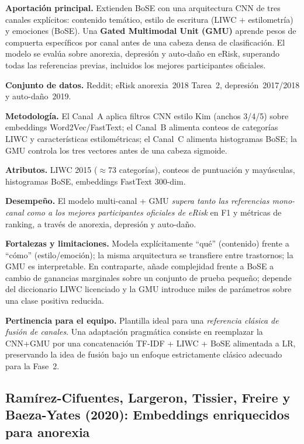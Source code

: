 \documentclass[journal]{IEEEtran}
\begin{document}
\textbf{Aportación principal.} Extienden BoSE con una arquitectura CNN de tres canales explícitos: contenido temático, estilo de escritura (LIWC + estilometría) y emociones (BoSE). Una \textbf{Gated Multimodal Unit (GMU)} aprende pesos de compuerta específicos por canal antes de una cabeza densa de clasificación. El modelo se evalúa sobre anorexia, depresión y auto-daño en eRisk, superando todas las referencias previas, incluidos los mejores participantes oficiales.

\textbf{Conjunto de datos.} Reddit; eRisk anorexia~2018 Tarea~2, depresión~2017/2018 y auto-daño~2019.

\textbf{Metodología.} El Canal~A aplica filtros CNN estilo Kim (anchos 3/4/5) sobre embeddings Word2Vec/FastText; el Canal~B alimenta conteos de categorías LIWC y características estilométricas; el Canal~C alimenta histogramas BoSE; la GMU controla los tres vectores antes de una cabeza sigmoide.

\textbf{Atributos.} LIWC 2015 ($\approx$73 categorías), conteos de puntuación y mayúsculas, histogramas BoSE, embeddings FastText 300-dim.

\textbf{Desempeño.} El modelo multi-canal + GMU \emph{supera tanto las referencias mono-canal como a los mejores participantes oficiales de eRisk} en F1 y métricas de ranking, a través de anorexia, depresión y auto-daño.

\textbf{Fortalezas y limitaciones.} Modela explícitamente ``qué'' (contenido) frente a ``cómo'' (estilo/emoción); la misma arquitectura se transfiere entre trastornos; la GMU es interpretable. En contraparte, añade complejidad frente a BoSE a cambio de ganancias marginales sobre un conjunto de prueba pequeño; depende del diccionario LIWC licenciado y la GMU introduce miles de parámetros sobre una clase positiva reducida.

\textbf{Pertinencia para el equipo.} Plantilla ideal para una \emph{referencia clásica de fusión de canales}. Una adaptación pragmática consiste en reemplazar la CNN+GMU por una concatenación TF-IDF + LIWC + BoSE alimentada a LR, preservando la idea de fusión bajo un enfoque estrictamente clásico adecuado para la Fase~2.

\subsection{Ramírez-Cifuentes, Largeron, Tissier, Freire y Baeza-Yates (2020): Embeddings enriquecidos para anorexia}
\end{document}
